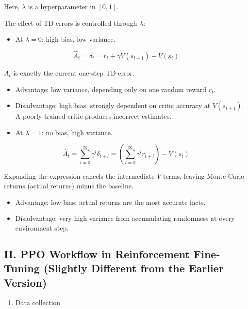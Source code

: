 Here, \(\lambda\) is a hyperparameter in \([0,1]\).

The effect of TD errors is controlled through \(\lambda\):

\begin{itemize}
\tightlist
\item
  At \(\lambda = 0\): high bias, low variance.
\end{itemize}

\[
\hat{A}_t = \delta_t = r_t + \gamma V(s_{t+1}) - V(s_t)
\]

\(A_t\) is exactly the current one-step TD error.

\begin{itemize}
\tightlist
\item
  Advantage: low variance, depending only on one random reward \(r_t\).
\item
  Disadvantage: high bias, strongly dependent on critic accuracy at \(V(s_{t+1})\). A poorly trained critic produces incorrect estimates.
\item
  At \(\lambda = 1\): no bias, high variance.
\end{itemize}

\[
\hat{A}_t
=
\sum_{l=0}^{\infty}\gamma^l\delta_{t+l}
=
\left(\sum_{l=0}^{\infty}\gamma^l r_{t+l}\right)
- V(s_t)
\]

Expanding the expression cancels the intermediate \(V\) terms, leaving Monte Carlo returns (actual returns) minus the baseline.

\begin{itemize}
\tightlist
\item
  Advantage: low bias; actual returns are the most accurate facts.
\item
  Disadvantage: very high variance from accumulating randomness at every environment step.
\end{itemize}

\hypertarget{ii.-ppo-workflow-in-reinforcement-fine-tuning-slightly-different-from-the-earlier-version}{%
\subsection{II. PPO Workflow in Reinforcement Fine-Tuning (Slightly Different from the Earlier Version)}\label{ii.-ppo-workflow-in-reinforcement-fine-tuning-slightly-different-from-the-earlier-version}}

\begin{enumerate}
\def\labelenumi{\arabic{enumi}.}
\tightlist
\item
  Data collection
\end{enumerate}

